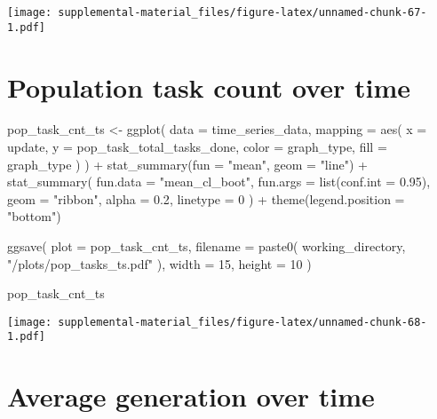 \documentclass[
]{book}
\newenvironment{Shaded}{\begin{snugshade}}{\end{snugshade}}
\newcommand{\AttributeTok}[1]{\textcolor[rgb]{0.77,0.63,0.00}{#1}}
\newcommand{\DecValTok}[1]{\textcolor[rgb]{0.00,0.00,0.81}{#1}}
\newcommand{\FloatTok}[1]{\textcolor[rgb]{0.00,0.00,0.81}{#1}}
\newcommand{\FunctionTok}[1]{\textcolor[rgb]{0.00,0.00,0.00}{#1}}
\newcommand{\NormalTok}[1]{#1}
\newcommand{\OtherTok}[1]{\textcolor[rgb]{0.56,0.35,0.01}{#1}}
\newcommand{\SpecialCharTok}[1]{\textcolor[rgb]{0.00,0.00,0.00}{#1}}
\newcommand{\StringTok}[1]{\textcolor[rgb]{0.31,0.60,0.02}{#1}}
\begin{document}
\texttt{[image: supplemental-material\_files/figure-latex/unnamed-chunk-67-1.pdf]}

\hypertarget{population-task-count-over-time}{%
\section{Population task count over time}\label{population-task-count-over-time}}

\begin{Shaded}
\begin{Highlighting}[]
\NormalTok{pop\_task\_cnt\_ts }\OtherTok{\textless{}{-}} \FunctionTok{ggplot}\NormalTok{(}
    \AttributeTok{data =}\NormalTok{ time\_series\_data,}
    \AttributeTok{mapping =} \FunctionTok{aes}\NormalTok{(}
      \AttributeTok{x =}\NormalTok{ update,}
      \AttributeTok{y =}\NormalTok{ pop\_task\_total\_tasks\_done,}
      \AttributeTok{color =}\NormalTok{ graph\_type,}
      \AttributeTok{fill =}\NormalTok{ graph\_type}
\NormalTok{    )}
\NormalTok{  ) }\SpecialCharTok{+}
  \FunctionTok{stat\_summary}\NormalTok{(}\AttributeTok{fun =} \StringTok{"mean"}\NormalTok{, }\AttributeTok{geom =} \StringTok{"line"}\NormalTok{) }\SpecialCharTok{+}
  \FunctionTok{stat\_summary}\NormalTok{(}
    \AttributeTok{fun.data =} \StringTok{"mean\_cl\_boot"}\NormalTok{,}
    \AttributeTok{fun.args =} \FunctionTok{list}\NormalTok{(}\AttributeTok{conf.int =} \FloatTok{0.95}\NormalTok{),}
    \AttributeTok{geom =} \StringTok{"ribbon"}\NormalTok{,}
    \AttributeTok{alpha =} \FloatTok{0.2}\NormalTok{,}
    \AttributeTok{linetype =} \DecValTok{0}
\NormalTok{  ) }\SpecialCharTok{+}
  \FunctionTok{theme}\NormalTok{(}\AttributeTok{legend.position =} \StringTok{"bottom"}\NormalTok{)}

\FunctionTok{ggsave}\NormalTok{(}
  \AttributeTok{plot =}\NormalTok{ pop\_task\_cnt\_ts,}
  \AttributeTok{filename =} \FunctionTok{paste0}\NormalTok{(}
\NormalTok{    working\_directory,}
    \StringTok{"/plots/pop\_tasks\_ts.pdf"}
\NormalTok{  ),}
  \AttributeTok{width =} \DecValTok{15}\NormalTok{,}
  \AttributeTok{height =} \DecValTok{10}
\NormalTok{)}

\NormalTok{pop\_task\_cnt\_ts}
\end{Highlighting}
\end{Shaded}

\texttt{[image: supplemental-material\_files/figure-latex/unnamed-chunk-68-1.pdf]}

\hypertarget{average-generation-over-time}{%
\section{Average generation over time}\label{average-generation-over-time}}
\end{document}
